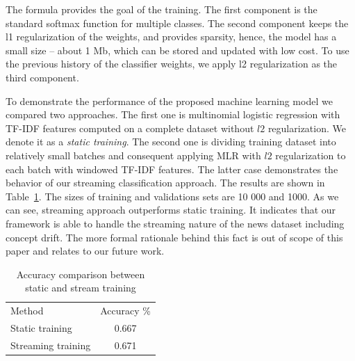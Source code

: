 The formula provides the goal of the training. The first component is the standard softmax function for multiple classes. The second component keeps the l1 regularization of the weights, and provides sparsity, hence, the model has a small size -- about 1 Mb, which can be stored and updated with low cost. To use the previous history of the classifier weights, we apply l2 regularization as the third component. 

To demonstrate the performance of the proposed machine learning model we compared two approaches. The first one is multinomial logistic regression with TF-IDF features computed on a complete dataset without $l2$ regularization. We denote it as a {\em static training}. The second one is dividing training dataset into relatively small batches and consequent applying MLR with $l2$ regularization to each batch with windowed TF-IDF features. The latter case demonstrates the behavior of our streaming classification approach. The results are shown in Table~\ref{accuracy}. The sizes of training and validations sets are 10 000 and 1000. As we can see, streaming approach outperforms static training. It indicates that our framework is able to handle the streaming nature of the news dataset including concept drift. The more formal rationale behind this fact is out of scope of this paper and relates to our future work.

\begin{table}[htbp]
\begin{tabular}{lc}
Method             & Accuracy \% \\
Static training    & 0.667       \\
Streaming training & 0.671         
\end{tabular}
\caption{Accuracy comparison between static and stream training}
\label{accuracy}
\vspace{-7mm}
\end{table}